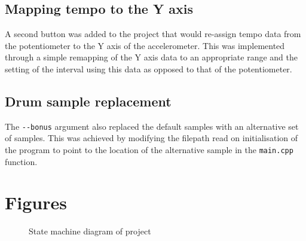 \documentclass[titlepage]{scrartcl}
\begin{document}
\subsection{Mapping tempo to the Y axis}
A second button was added to the project that would re-assign tempo data from
the potentiometer to the Y axis of the accelerometer. This was implemented
through a simple remapping of the Y axis data to an appropriate range and the
setting of the interval using this data as opposed to that of the
potentiometer.

\subsection{Drum sample replacement}
The \texttt{-{}-bonus} argument also replaced the default samples with an
alternative set of samples. This was achieved by modifying the filepath read on
initialisation of the program to point to the location of the alternative
sample in the \texttt{main.cpp} function. 

\newpage
\section{Figures}
\begin{figure}[H]
    \caption{State machine diagram of project}
    \label{RTDSP}
\end{figure}
\end{document}
